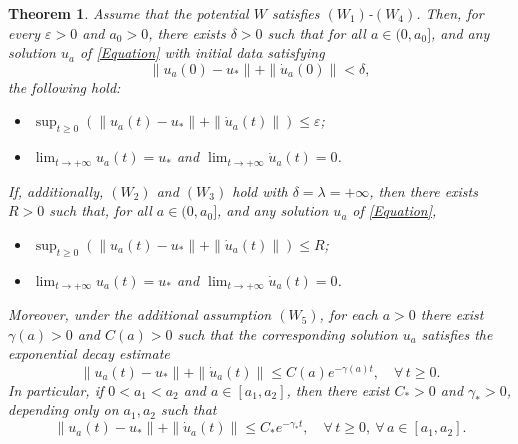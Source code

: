 \documentclass[12pt]{amsart}
\numberwithin{equation}{section}
\newtheorem{theorem}{Theorem}[section]
\begin{document}
\begin{theorem}\label{Teo1}
	Assume that the potential $W$ satisfies \hyperlink{W1}{$(W_1)$}-\hyperlink{W4}{$(W_4)$}. Then, for every $\varepsilon > 0$ and $a_0 > 0$, there exists $\delta > 0$ such that for all $a \in (0, a_0]$, and any solution $u_a$ of \eqref{Equation} with initial data satisfying
	$$
	\|u_a(0)-u_*\| + \|\dot{u}_a(0)\| < \delta,
	$$
	the following hold:
	\begin{itemize}
		\item[\emph{(a)}] $\displaystyle \sup_{t \ge 0} \left( \|u_a(t)-u_*\| + \|\dot{u}_a(t)\| \right) \le \varepsilon$;
		\item[\emph{(b)}] $\displaystyle \lim_{t \to +\infty} u_a(t) =u_*$ and $\displaystyle\lim_{t \to +\infty} \dot{u}_a(t) = 0$.
	\end{itemize}
	If, additionally, \hyperlink{W2}{$(W_2)$} and \hyperlink{W3}{$(W_3)$} hold with $\delta = \lambda = +\infty$, then there exists $R > 0$ such that, for all $a \in (0, a_0]$, and any solution $u_a$ of \eqref{Equation},
	\begin{itemize}
		\item[\emph{(c)}] $\displaystyle \sup_{t \ge 0} \left( \|u_a(t)-u_*\| + \|\dot{u}_a(t)\| \right) \le R$;
		\item[\emph{(d)}] $\displaystyle \lim_{t \to +\infty} u_a(t) =u_*$ and  $\displaystyle\lim_{t \to +\infty} \dot{u}_a(t) = 0$.
	\end{itemize}
	Moreover, under the additional assumption \hyperlink{W5}{$(W_5)$}, for each $a >0$ there exist $\gamma(a) > 0$ and $C(a)>0$ such that the corresponding solution $u_a$ satisfies the exponential decay estimate
	\begin{equation*}
		\|u_a(t)-u_*\| + \|\dot{u}_a(t)\| \le C(a) e^{-\gamma(a) t}, \quad \forall\, t \ge 0.
	\end{equation*}
	In particular, if $0<a_1<a_2$ and $a\in[a_1,a_2]$, then there exist $C_*>0$ and $\gamma_*>0$, depending only on $a_1,a_2$ such that
	\begin{equation*}
		\|u_a(t)-u_*\| + \|\dot{u}_a(t)\| \le C_* e^{-\gamma_* t},\quad \forall\, t \ge 0,\ \forall\, a\in[a_1,a_2].
	\end{equation*}
\end{theorem}
\end{document}
